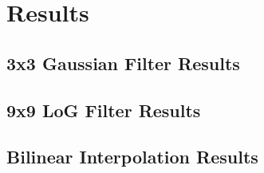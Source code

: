 
\chapter{Results}

\section{3x3 Gaussian Filter Results}

\section{9x9 LoG Filter Results}

\section{Bilinear Interpolation Results}
